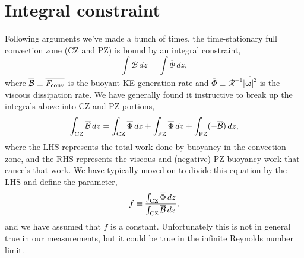 \documentclass[12pt]{article}
\renewcommand{\vec}[1]{\boldsymbol{#1}}
\renewcommand{\bar}[1]{\overline{#1}}
\newcommand{\Fconv}{\ensuremath{F_{\rm{conv}}}}
\newcommand{\mB}{\ensuremath{\mathcal{B}}}
\begin{document}
\section{Integral constraint}
Following arguments we've made a bunch of times, the time-stationary full convection zone (CZ and PZ) is bound by an integral constraint,
\begin{equation}
\int \bar{\mB}\,dz = \int \bar{\Phi}\,dz,
\end{equation}
where $\bar{\mB} \equiv \bar{\Fconv}$ is the buoyant KE generation rate and $\bar{\Phi} \equiv \mathcal{R}^{-1}\bar{|\vec{\omega}|^2}$ is the viscous dissipation rate.
We have generally found it instructive to break up the integrals above into CZ and PZ portions,
\begin{equation}
\int_{\rm{CZ}} \bar{\mB}\,dz = \int_{\rm{CZ}} \bar{\Phi}\,dz + \int_{\rm{PZ}} \bar{\Phi}\,dz + \int_{\rm{PZ}} (-\bar{\mB})\,dz,
\end{equation}
where the LHS represents the total work done by buoyancy in the convection zone, and the RHS represents the viscous and (negative) PZ buoyancy work that cancels that work.
We have typically moved on to divide this equation by the LHS and define the parameter,
\begin{equation}
f \equiv \frac{\int_{\rm{CZ}}\bar{\Phi}\,dz}{\int_{\rm{CZ}}\bar{\mB}\,dz},
\label{eqn:f_defn}
\end{equation}
and we have assumed that $f$ is a constant.
Unfortunately this is not in general true in our measurements, but it could be true in the infinite Reynolds number limit.
\end{document}
